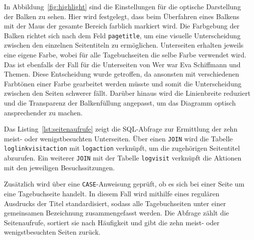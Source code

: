 In Abbildung~\ref{fig:highlight} sind die Einstellungen für die optische Darstellung der Balken zu sehen. Hier wird festgelegt, dass beim Überfahren eines Balkens mit der Maus der gesamte Bereich farblich markiert wird. Die Farbgebung der Balken richtet sich nach dem Feld \texttt{page\textunderscore title}, um eine visuelle Unterscheidung zwischen den einzelnen Seitentiteln zu ermöglichen. Unterseiten erhalten jeweils eine eigene Farbe, wobei für alle Tagebuchseiten die selbe Farbe verwendet wird. Das ist ebenfalls der Fall für die Unterseiten von \glqq Wer war Eva Schiffmann\grqq{} und \glqq Themen\grqq{}. Diese Entscheidung wurde getroffen, da ansonsten mit verschiedenen Farbtönen einer Farbe gearbeitet werden müsste und somit die Unterscheidung zwischen den Seiten schwerer fällt. Darüber hinaus wird die Linienbreite reduziert und die Transparenz der Balkenfüllung angepasst, um das Diagramm optisch ansprechender zu machen.

\begin{figure}[H]
    \centering
    \begin{minipage}{\textwidth}
        
    \end{minipage}
\end{figure}

Das Listing~\ref{lst:seitenaufrufe} zeigt die SQL-Abfrage zur Ermittlung der zehn meist- oder wenigstbesuchten Unterseiten. Über einen \texttt{JOIN} wird die Tabelle \texttt{log\textunderscore link\textunderscore visit\textunderscore action} mit \texttt{log\textunderscore action} verknüpft, um die zugehörigen Seitentitel abzurufen. Ein weiterer \texttt{JOIN} mit der Tabelle \texttt{log\textunderscore visit} verknüpft die Aktionen mit den jeweiligen Besuchssitzungen.

Zusätzlich wird über eine \texttt{CASE}-Anweisung geprüft, ob es sich bei einer Seite um eine Tagebuchseite handelt. In diesem Fall wird mithilfe eines regulären Ausdrucks der Titel standardisiert, sodass alle Tagebuchseiten unter einer gemeinsamen Bezeichnung zusammengefasst werden. Die Abfrage zählt die Seitenaufrufe, sortiert sie nach Häufigkeit und gibt die zehn meist- oder wenigstbesuchten Seiten zurück.

